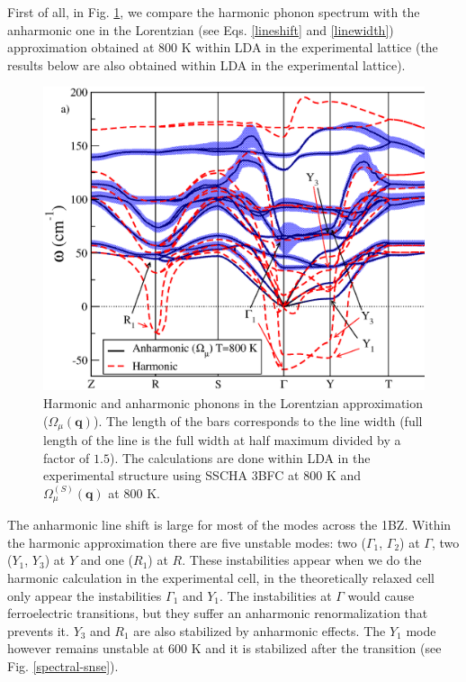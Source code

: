First of all, in Fig. \ref{spectrum-phonon-snse}, we compare the harmonic phonon spectrum with the anharmonic one in the Lorentzian (see Eqs. \ref{lineshift} and \ref{linewidth}) approximation obtained at $800$ K within LDA in 
the experimental lattice (the results below are also obtained within LDA in the experimental lattice).
\begin{figure}[h]
\includegraphics[width=\linewidth]{Figures/spectrum-snse.eps}
\caption[Phonons in the Lorentzian approximation in SnSe.]{Harmonic and anharmonic phonons in the Lorentzian approximation ($\Omega_{\mu}(\mathbf{q})$). The length of the bars corresponds to the line width (full length of the line 
is the full width at half maximum divided by a factor of $1.5$). The calculations are done within LDA in the experimental structure using SSCHA 3BFC at $800$ K and $\Omega^{(S)}_{\mu}(\mathbf{q})$ at $800$ K.}
\label{spectrum-phonon-snse}
\end{figure}
The anharmonic line shift is large for most of the modes across the 1BZ. Within the harmonic approximation there are five unstable modes: two ($\Gamma_{1}$, $\Gamma_{2}$) at $\Gamma$, two ($Y_{1}$, $Y_{3}$) at $Y$ and one 
($R_{1}$) at $R$. These instabilities appear when we do the harmonic calculation in the experimental cell, in the theoretically relaxed cell only appear the instabilities $\Gamma_{1}$ and $Y_{1}$. The instabilities at $\Gamma$ would cause ferroelectric transitions\cite{skelton2016anharmonicity,hong2016electronic}, but they suffer an anharmonic renormalization that prevents it. $Y_{3}$ and $R_{1}$ are also stabilized by anharmonic effects. The $Y_{1}$ mode however remains unstable at $600$ K and it is stabilized after the transition (see Fig. \ref{spectral-snse}). \\

